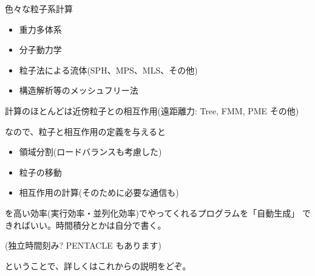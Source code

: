 \documentclass[12pt,dvipdfmx]{article}
\begin{document}






色々な粒子系計算

\begin{itemize}

\item 重力多体系

\item 分子動力学

\item 粒子法による流体(SPH、MPS、MLS、その他)
\item 構造解析等のメッシュフリー法

\end{itemize}

計算のほとんどは近傍粒子との相互作用(遠距離力: Tree, FMM, PME その他)



なので、粒子と相互作用の定義を与えると

\begin{itemize}

\item 領域分割(ロードバランスも考慮した)

\item 粒子の移動

\item 相互作用の計算(そのために必要な通信も)

\end{itemize}

を高い効率(実行効率・並列化効率)でやってくれるプログラムを「自動生成」
できればいい。時間積分とかは自分で書く。

(独立時間刻み? PENTACLE もあります)

ということで、詳しくはこれからの説明をどぞ。
\end{document}
